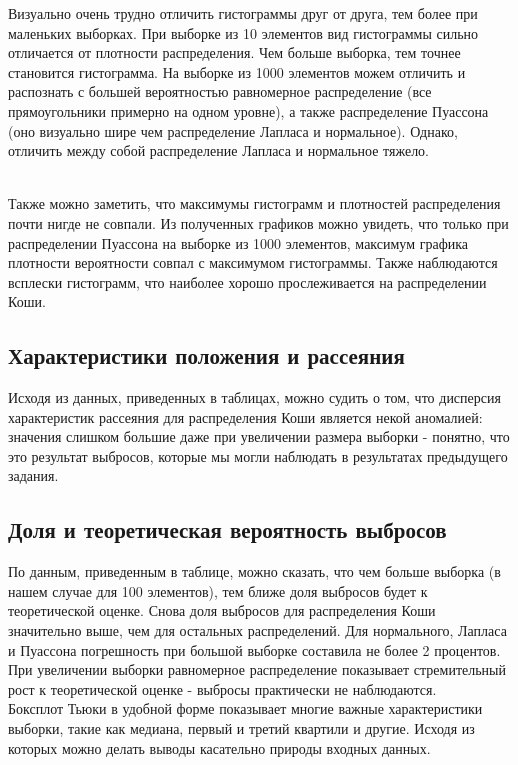 \documentclass[a4paper]{article}
\begin{document}
\noindent Визуально очень трудно отличить гистограммы друг от друга, тем более при маленьких выборках. При выборке из 10 элементов вид гистограммы сильно отличается от плотности распределения. Чем больше выборка, тем точнее становится гистограмма. На выборке из 1000 элементов можем отличить  и распознать с большей вероятностью равномерное распределение (все прямоугольники примерно на одном уровне), а также распределение Пуассона (оно визуально шире чем распределение Лапласа и нормальное). Однако, отличить между собой распределение Лапласа и нормальное тяжело.\\\
 
\noindent Также можно заметить, что максимумы гистограмм и плотностей распределения почти нигде не совпали. Из полученных графиков можно увидеть, что только при распределении Пуассона на выборке из 1000 элементов, максимум графика плотности вероятности совпал с максимумом гистограммы. Также наблюдаются всплески гистограмм, что наиболее хорошо прослеживается на распределении Коши. 

\subsection{Характеристики положения и рассеяния}

\noindent Исходя из данных, приведенных в таблицах, можно судить о том, что дисперсия характеристик рассеяния для распределения Коши является некой аномалией: значения слишком большие даже при увеличении размера выборки - понятно, что это результат выбросов, которые мы могли наблюдать в результатах предыдущего задания.

\subsection{Доля и теоретическая вероятность выбросов}

\noindent По данным, приведенным в таблице, можно сказать, что чем больше выборка (в нашем случае для 100 элементов), тем ближе доля выбросов будет к теоретической оценке. Снова доля выбросов для распределения Коши значительно выше, чем для остальных распределений. Для нормального, Лапласа и Пуассона погрешность при большой выборке составила не более 2 процентов. При увеличении выборки равномерное распределение показывает стремительный рост к теоретической оценке - выбросы практически не наблюдаются.\\

\noindent Боксплот Тьюки в удобной форме показывает многие важные характеристики выборки, такие как медиана, первый и третий квартили и другие. Исходя из которых можно делать выводы касательно природы входных данных.
\end{document}
